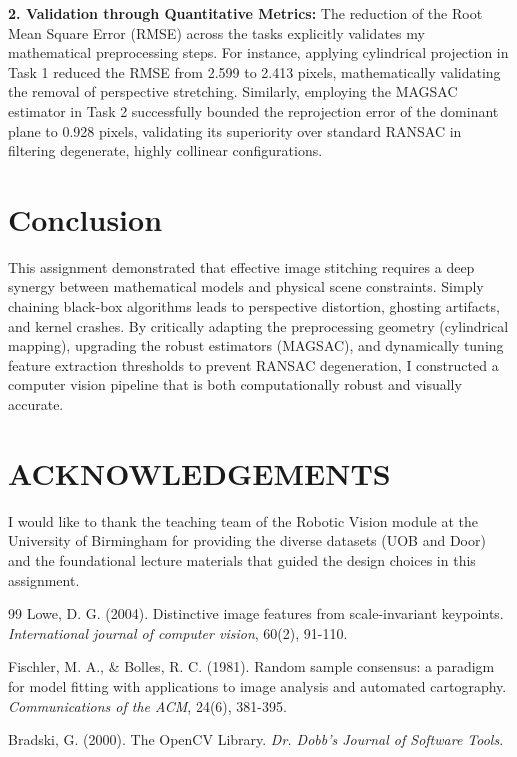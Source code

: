 \documentclass{Resources/UoBLab1}
\begin{document}
    \textbf{2. Validation through Quantitative Metrics:} The reduction of the Root
    Mean Square Error (RMSE) across the tasks explicitly validates my mathematical
    preprocessing steps. For instance, applying cylindrical projection in Task 1
    reduced the RMSE from 2.599 to 2.413 pixels, mathematically validating the
    removal of perspective stretching. Similarly, employing the MAGSAC estimator
    in Task 2 successfully bounded the reprojection error of the dominant plane
    to 0.928 pixels, validating its superiority over standard RANSAC in filtering
    degenerate, highly collinear configurations.

    \section{Conclusion}
    This assignment demonstrated that effective image stitching requires a deep
    synergy between mathematical models and physical scene constraints. Simply chaining
    black-box algorithms leads to perspective distortion, ghosting artifacts, and
    kernel crashes. By critically adapting the preprocessing geometry (cylindrical
    mapping), upgrading the robust estimators (MAGSAC), and dynamically tuning
    feature extraction thresholds to prevent RANSAC degeneration, I constructed a
    computer vision pipeline that is both computationally robust and visually accurate.

    \section*{ACKNOWLEDGEMENTS}
    I would like to thank the teaching team of the Robotic Vision module at the University
    of Birmingham for providing the diverse datasets (UOB and Door) and the foundational
    lecture materials that guided the design choices in this assignment.

    \begin{thebibliography}{99}
         Lowe, D. G. (2004). Distinctive image features from scale-invariant
            keypoints. \textit{International journal of computer vision}, 60(2),
            91-110.

         Fischler, M. A., \& Bolles, R. C. (1981). Random sample
            consensus: a paradigm for model fitting with applications to image
            analysis and automated cartography. \textit{Communications of the
            ACM}, 24(6), 381-395.

         Bradski, G. (2000). The OpenCV Library. \textit{Dr.
            Dobb's Journal of Software Tools}.
    \end{thebibliography}
\end{document}
